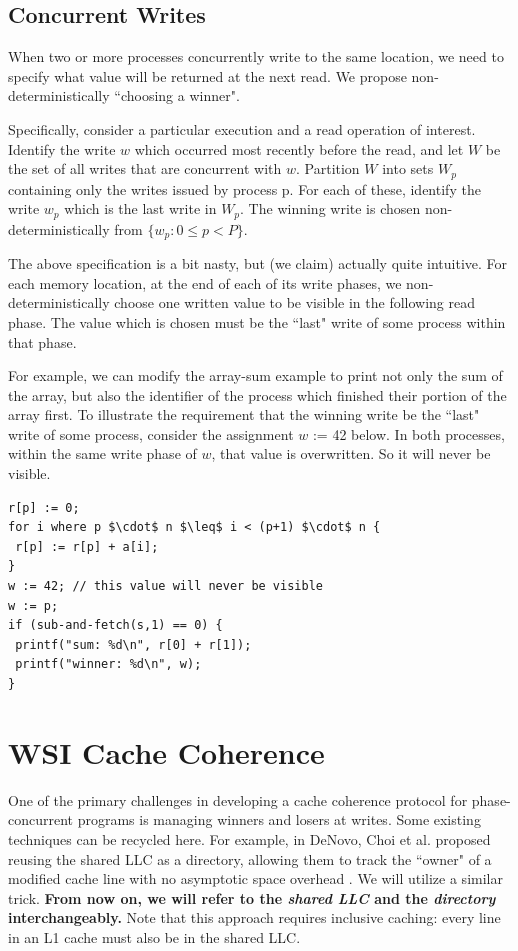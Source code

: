 \documentclass{article}
\begin{document}
\subsection{Concurrent Writes}
When two or more processes concurrently write to the same location, we need to specify what value will be returned at the next read. We propose non-deterministically ``choosing a winner".

Specifically, consider a particular execution and a read operation of interest. Identify the write $w$ which occurred most recently before the read, and let $W$ be the set of all writes that are concurrent with $w$. Partition $W$ into sets $W_p$ containing only the writes issued by process p. For each of these, identify the write $w_p$ which is the last write in $W_p$. The winning write is chosen non-deterministically from $\{w_p : 0 \leq p < P\}$.

The above specification is a bit nasty, but (we claim) actually quite intuitive. For each memory location, at the end of each of its write phases, we non-deterministically choose one written value to be visible in the following read phase. The value which is chosen must be the ``last" write of some process within that phase.

For example, we can modify the array-sum example to print not only the sum of the array, but also the identifier of the process which finished their portion of the array first. To illustrate the requirement that the winning write be the ``last" write of some process, consider the assignment $w$ := 42 below. In both processes, within the same write phase of $w$, that value is overwritten. So it will never be visible.

\begin{lstlisting}
r[p] := 0;
for i where p $\cdot$ n $\leq$ i < (p+1) $\cdot$ n {
 r[p] := r[p] + a[i];
}
w := 42; // this value will never be visible
w := p;
if (sub-and-fetch(s,1) == 0) {
 printf("sum: %d\n", r[0] + r[1]);
 printf("winner: %d\n", w);
}
\end{lstlisting}


\section{WSI Cache Coherence}
One of the primary challenges in developing a cache coherence protocol for phase-concurrent programs is managing winners and losers at writes. Some existing techniques can be recycled here. For example, in DeNovo, Choi et al. proposed reusing the shared LLC as a directory, allowing them to track the ``owner" of a modified cache line with no asymptotic space overhead \cite{choi2010denovo}. We will utilize a similar trick. \textbf{From now on, we will refer to the \textit{shared LLC} and the \textit{directory} interchangeably.} Note that this approach requires inclusive caching: every line in an L1 cache must also be in the shared LLC.
\end{document}
